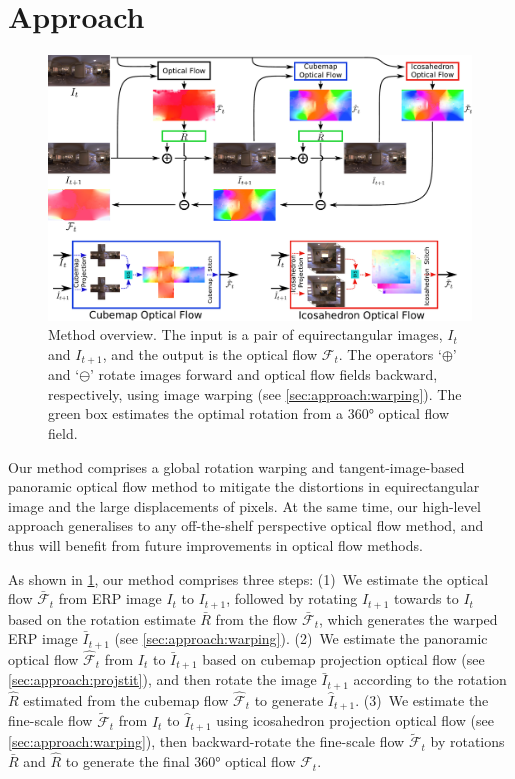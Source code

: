 \section{Approach}
\label{sec:approach}

\begin{figure}%
	\centering
	\includegraphics[width=0.95\linewidth]{images/method_pipeline_1.pdf}
	\caption{Method overview.
		The input is a pair of equirectangular images, $I_t$ and $I_{t+1}$, and the output is the optical flow $\mathcal{F}_t$.
		The operators `$\oplus$' and `$\ominus$' rotate images forward and optical flow fields backward, respectively, using image warping (see \cref{sec:approach:warping}).
		The green box estimates the optimal rotation from a 360° optical flow field.
	}
	\label{fig:approach:pipeline}
\end{figure}

Our method comprises a global rotation warping and tangent-image-based panoramic optical flow method to mitigate the distortions in equirectangular image and the large displacements of pixels.
At the same time, our high-level approach generalises to any off-the-shelf perspective optical flow method, and thus will benefit from future improvements in optical flow methods.


As shown in \cref{fig:approach:pipeline}, our method comprises three steps:
%
(1)~We estimate the optical flow $\bar{\mathcal{F}}_t$ from ERP image $I_{t}$ to ${I_{t+1}}$, followed by rotating $I_{t+1}$ towards to $I_{t}$ based on the rotation estimate $\bar{R}$ from the flow $\bar{\mathcal{F}}_t$, which generates the warped ERP image ${\bar{I}}_{t+1}$ (see \cref{sec:approach:warping}).
%
(2)~We estimate the panoramic optical flow ${\hat{\mathcal{F}}}_t$ from $I_{t}$ to ${\bar{I}}_{t+1}$ based on cubemap projection optical flow (see \cref{sec:approach:projstit}), and then rotate the image ${\bar{I}}_{t+1}$ according to the rotation $\hat{R}$ estimated from the cubemap flow ${\hat{\mathcal{F}}}_t$ to generate ${\hat{I}}_{t+1}$.
%
(3)~We estimate the fine-scale flow $\tilde{\mathcal{F}}_t$ from $I_{t}$ to ${\hat{I}}_{t+1}$ using icosahedron projection optical flow (see \cref{sec:approach:warping}), then backward-rotate the fine-scale flow $\tilde{\mathcal{F}}_t$ by rotations $\bar{R}$ and $\hat{R}$ to generate the final 360° optical flow $\mathcal{F}_t$.


